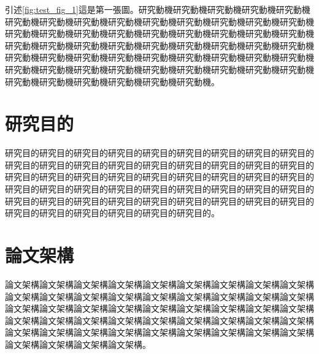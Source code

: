 引述\ref{fig:test_fig_1}這是第一張圖。研究動機研究動機研究動機研究動機研究動機研究動機研究動機研究動機研究動機研究動機研究動機研究動機研究動機研究動機研究動機研究動機研究動機研究動機研究動機研究動機研究動機研究動機研究動機研究動機研究動機研究動機研究動機研究動機研究動機研究動機研究動機研究動機研究動機研究動機研究動機研究動機研究動機研究動機研究動機研究動機研究動機研究動機研究動機研究動機研究動機研究動機研究動機研究動機研究動機研究動機研究動機研究動機研究動機研究動機研究動機研究動機。


\section{研究目的}

研究目的研究目的研究目的研究目的研究目的研究目的研究目的研究目的研究目的研究目的研究目的研究目的研究目的研究目的研究目的研究目的研究目的研究目的研究目的研究目的研究目的研究目的研究目的研究目的研究目的研究目的研究目的研究目的研究目的研究目的研究目的研究目的研究目的研究目的研究目的研究目的研究目的研究目的研究目的研究目的研究目的研究目的研究目的研究目的研究目的研究目的研究目的研究目的研究目的研究目的研究目的。


\section{論文架構}
論文架構論文架構論文架構論文架構論文架構論文架構論文架構論文架構論文架構論文架構論文架構論文架構論文架構論文架構論文架構論文架構論文架構論文架構論文架構論文架構論文架構論文架構論文架構論文架構論文架構論文架構論文架構論文架構論文架構論文架構論文架構論文架構論文架構論文架構論文架構論文架構論文架構論文架構論文架構論文架構論文架構論文架構論文架構論文架構論文架構論文架構論文架構論文架構論文架構。